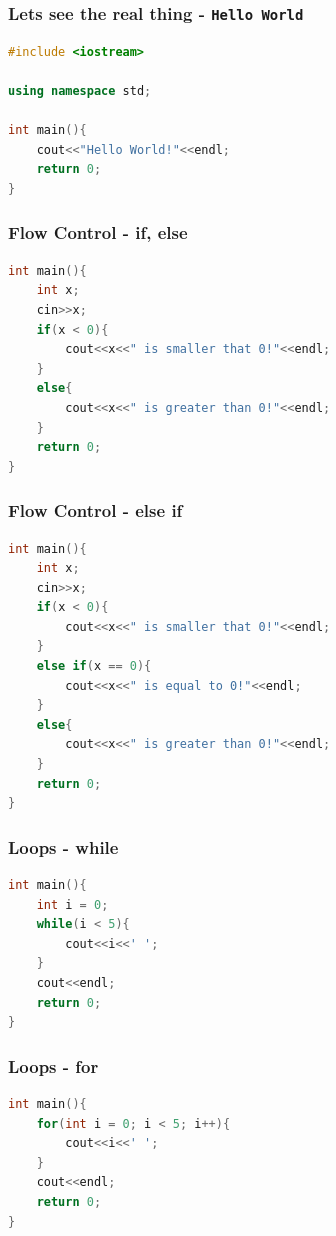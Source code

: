 \documentclass{beamer}
\begin{document}

\begin{frame}[fragile]
    \frametitle{Lets see the real thing - \texttt{Hello World}}

    \begin{lstlisting}[language=C++]
#include <iostream>

using namespace std;

int main(){
    cout<<"Hello World!"<<endl;
    return 0;
}
    \end{lstlisting}
\end{frame}

\begin{frame}[fragile]
    \frametitle{Flow Control - if, else}

    \begin{lstlisting}[language=C++]
int main(){
    int x;
    cin>>x;
    if(x < 0){
        cout<<x<<" is smaller that 0!"<<endl;
    }
    else{
        cout<<x<<" is greater than 0!"<<endl;
    }
    return 0;
}
    \end{lstlisting}
\end{frame}

\begin{frame}[fragile]
    \frametitle{Flow Control - else if}

    \begin{lstlisting}[language=C++]
int main(){
    int x;
    cin>>x;
    if(x < 0){
        cout<<x<<" is smaller that 0!"<<endl;
    }
    else if(x == 0){
        cout<<x<<" is equal to 0!"<<endl;
    }
    else{
        cout<<x<<" is greater than 0!"<<endl;
    }
    return 0;
}
    \end{lstlisting}
\end{frame}

\begin{frame}[fragile]
    \frametitle{Loops - while}

    \begin{lstlisting}[language=C++]
int main(){
    int i = 0;
    while(i < 5){
        cout<<i<<' ';
    }
    cout<<endl;
    return 0;
}
    \end{lstlisting}
\end{frame}

\begin{frame}[fragile]
    \frametitle{Loops - for}

    \begin{lstlisting}[language=C++]
int main(){
    for(int i = 0; i < 5; i++){
        cout<<i<<' ';
    }
    cout<<endl;
    return 0;
}
    \end{lstlisting}
\end{frame}
\end{document}
